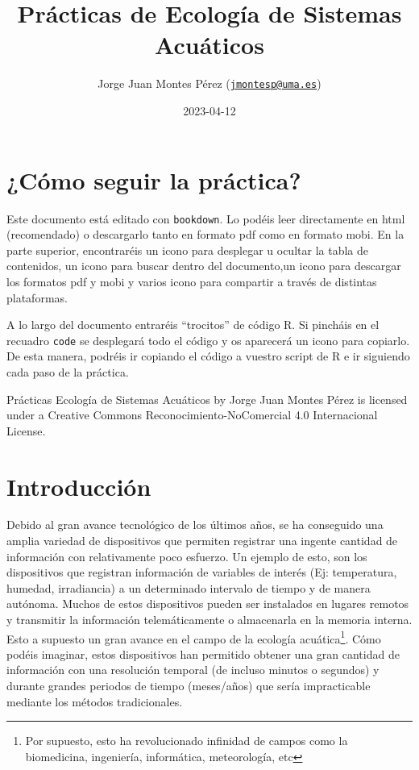 \documentclass[
]{book}
\title{Prácticas de Ecología de Sistemas Acuáticos}
\author{Jorge Juan Montes Pérez (\href{mailto:jmontesp@uma.es}{\nolinkurl{jmontesp@uma.es}})}
\date{2023-04-12}
\newcommand{\passthrough}[1]{#1}
\begin{document}
\maketitle

{
\setcounter{tocdepth}{1}
\tableofcontents
}
\hypertarget{cuxf3mo-seguir-la-pruxe1ctica}{%
\chapter*{¿Cómo seguir la práctica?}\label{cuxf3mo-seguir-la-pruxe1ctica}}

Este documento está editado con \passthrough{\lstinline!bookdown!}. Lo podéis leer directamente en html (recomendado) o descargarlo tanto en formato pdf como en formato mobi. En la parte superior, encontraréis un icono para desplegar u ocultar la tabla de contenidos, un icono para buscar dentro del documento,un icono para descargar los formatos pdf y mobi y varios icono para compartir a través de distintas plataformas.

A lo largo del documento entraréis ``trocitos'' de código R. Si pincháis en el recuadro \passthrough{\lstinline!code!} se desplegará todo el código y os aparecerá un icono para copiarlo. De esta manera, podréis ir copiando el código a vuestro script de R e ir siguiendo cada paso de la práctica.

{Prácticas Ecología de Sistemas Acuáticos} by {Jorge Juan Montes Pérez} is licensed under a Creative Commons Reconocimiento-NoComercial 4.0 Internacional License.

\hypertarget{introducciuxf3n}{%
\chapter{Introducción}\label{introducciuxf3n}}

Debido al gran avance tecnológico de los últimos años, se ha conseguido una amplia variedad de dispositivos que permiten registrar una ingente cantidad de información con relativamente poco esfuerzo. Un ejemplo de esto, son los dispositivos que registran información de variables de interés (Ej: temperatura, humedad, irradiancia) a un determinado intervalo de tiempo y de manera autónoma. Muchos de estos dispositivos pueden ser instalados en lugares remotos y transmitir la información telemáticamente o almacenarla en la memoria interna. Esto a supuesto un gran avance en el campo de la ecología acuática\footnote{Por supuesto, esto ha revolucionado infinidad de campos como la biomedicina, ingeniería, informática, meteorología, etc}. Cómo podéis imaginar, estos dispositivos han permitido obtener una gran cantidad de información con una resolución temporal (de incluso minutos o segundos) y durante grandes periodos de tiempo (meses/años) que sería impracticable mediante los métodos tradicionales.
\end{document}
